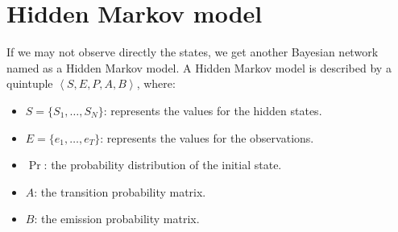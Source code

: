 \section{Hidden Markov model}

If we may not observe directly the states, we get another Bayesian network named as a Hidden Markov model.
A Hidden Markov model is described by a quintuple $\left\langle S,E,P,A,B \right\rangle$, where: 
\begin{itemize}
    \item $S=\{S_1,\dots,S_N\}$: represents the values for the hidden states.
    \item $E=\{e_1,\dots,e_T\}$: represents the values for the observations. 
    \item $\Pr$: the probability distribution of the initial state.
    \item $A$: the transition probability matrix.
    \item $B$: the emission probability matrix.
\end{itemize}
